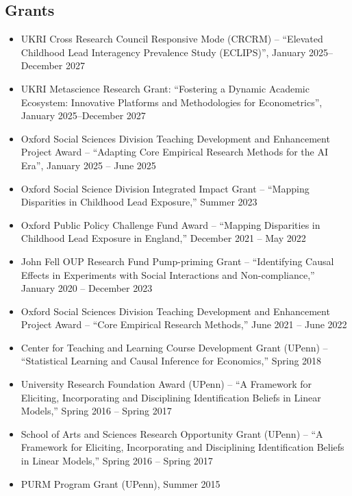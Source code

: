 \documentclass[line,overlapped]{myres}
\begin{document}
\begin{resume}
\section{\sc Grants}
\begin{itemize}
  \item UKRI Cross Research Council Responsive Mode (CRCRM) -- ``Elevated Childhood Lead Interagency Prevalence Study (ECLIPS)'', January 2025--December 2027 %
  \item UKRI Metascience Research Grant: ``Fostering a Dynamic Academic Ecosystem: Innovative Platforms and Methodologies for Econometrics'', January 2025--December 2027 %
  \item Oxford Social Sciences Division Teaching Development and Enhancement Project Award -- ``Adapting Core Empirical Research Methods for the AI Era'', January 2025 -- June 2025 %
  \item Oxford Social Science Division Integrated Impact Grant -- ``Mapping Disparities in Childhood Lead Exposure,'' Summer 2023 %
  \item Oxford Public Policy Challenge Fund Award -- ``Mapping Disparities in Childhood Lead Exposure in England,'' December 2021 -- May 2022 %
  \item John Fell OUP Research Fund Pump-priming Grant -- ``Identifying Causal Effects in Experiments with Social Interactions and Non-compliance,'' January 2020 -- December 2023 %
  \item Oxford Social Sciences Division Teaching Development and Enhancement Project Award -- ``Core Empirical Research Methods,'' June 2021 -- June 2022 %
  \item Center for Teaching and Learning Course Development Grant (UPenn) -- ``Statistical Learning and Causal Inference for Economics,'' Spring 2018 %
  \item University Research Foundation Award (UPenn) -- ``A Framework for Eliciting, Incorporating and Disciplining Identification Beliefs in Linear Models,'' Spring 2016 -- Spring 2017 %
  \item School of Arts and Sciences Research Opportunity Grant (UPenn) -- ``A Framework for Eliciting, Incorporating and Disciplining Identification Beliefs in Linear Models,'' Spring 2016 -- Spring 2017  %
  \item PURM Program Grant (UPenn), Summer 2015 %
\end{itemize}



\end{resume}
\end{document}

